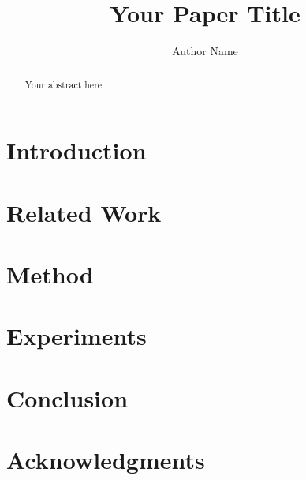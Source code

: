 \documentclass[sigconf]{acmart}
\title{Your Paper Title}
\author{Author Name}
\affiliation{
  \institution{Institution}
  \city{City}
  \country{Country}
}
\begin{document}
\begin{abstract}
Your abstract here.
\end{abstract}

\maketitle

\section{Introduction}

\section{Related Work}

\section{Method}

\section{Experiments}

\section{Conclusion}

\section*{Acknowledgments}



\end{document}
